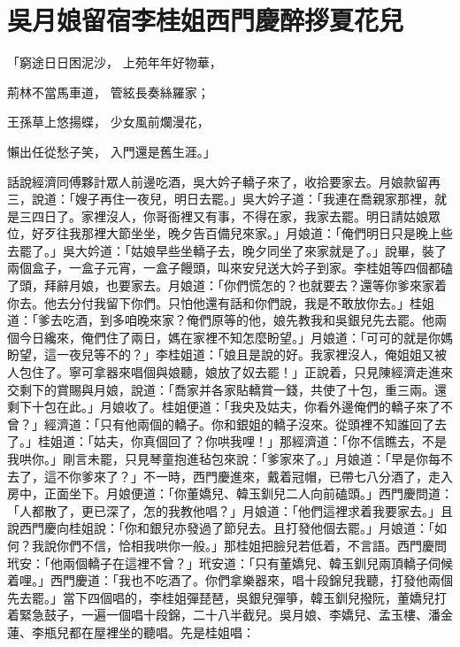%

\chapter{吳月娘留宿李桂姐\KG 西門慶醉拶夏花兒}

「窮途日日困泥沙，  上苑年年好物華，

荊林不當馬車道，  管絃長奏絲羅家；

王孫草上悠揚蝶，  少女風前爛漫花，

懶出任從愁子笑，  入門還是舊生涯。」

話說經濟同傅夥計眾人前邊吃酒，吳大妗子轎子來了，收拾要家去。月娘款留再三，說道：「嫂子再住一夜兒，明日去罷。」吳大妗子道：「我連在喬親家那裡，就是三四日了。家裡沒人，你哥衙裡又有事，不得在家，我家去罷。明日請姑娘眾位，好歹往我那裡大節坐坐，晚夕告百備兒來家。」月娘道：「俺們明日只是晚上些去罷了。」吳大妗道：「姑娘早些坐轎子去，晚夕同坐了來家就是了。」說畢，裝了兩個盒子，一盒子元宵，一盒子饅頭，叫來安兒送大妗子到家。李桂姐等四個都磕了頭，拜辭月娘，也要家去。月娘道：「你們慌怎的？也就要去？還等你爹來家着你去。他去分付我留下你們。只怕他還有話和你們說，我是不敢放你去。」桂姐道：「爹去吃酒，到多咱晚來家？俺們原等的他，娘先教我和吳銀兒先去罷。他兩個今日纔來，俺們住了兩日，媽在家裡不知怎麼盼望。」月娘道：「可可的就是你媽盼望，這一夜兒等不的？」李桂姐道：「娘且是說的好。我家裡沒人，俺姐姐又被人包住了。寧可拿器來唱個與娘聽，娘放了奴去罷！」正說着，只見陳經濟走進來交剩下的賞賜與月娘，說道：「喬家并各家貼轎賞一錢，共使了十包，重三兩。還剩下十包在此。」月娘收了。桂姐便道：「我央及姑夫，你看外邊俺們的轎子來了不曾？」經濟道：「只有他兩個的轎子。你和銀姐的轎子沒來。從頭裡不知誰回了去了。」桂姐道：「姑夫，你真個回了？你哄我哩！」那經濟道：「你不信瞧去，不是我哄你。」剛言未罷，只見琴童抱進毡包來說：「爹家來了。」月娘道：「早是你每不去了，這不你爹來了？」不一時，西門慶進來，戴着冠帽，已帶七八分酒了，走入房中，正面坐下。月娘便道：「你董嬌兒、韓玉釧兒二人向前磕頭。」西門慶問道：「人都散了，更已深了，怎的我教他唱？」月娘道：「他們這裡求着我要家去。」且說西門慶向桂姐說：「你和銀兒亦發過了節兒去。且打發他個去罷。」月娘道：「如何？我說你們不信，恰相我哄你一般。」那桂姐把臉兒若低着，不言語。西門慶問玳安：「他兩個轎子在這裡不曾？」玳安道：「只有董嬌兒、韓玉釧兒兩頂轎子伺候着哩。」西門慶道：「我也不吃酒了。你們拿樂器來，唱十段錦兒我聽，打發他兩個先去罷。」當下四個唱的，李桂姐彈琵琶，吳銀兒彈箏，韓玉釧兒撥阮，董嬌兒打着緊急鼓子，一遍一個唱十段錦，二十八半截兒。吳月娘、李嬌兒、孟玉樓、潘金蓮、李瓶兒都在屋裡坐的聽唱。先是桂姐唱：

